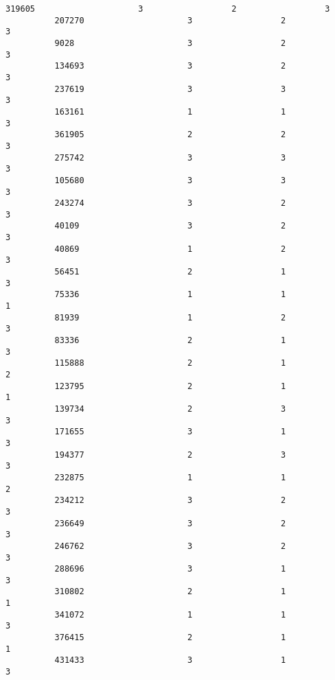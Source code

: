 \documentclass[11pt]{article}
\begin{document}
\begin{Verbatim}[commandchars=\\\{\}]
          319605                     3                  2                  3   
          207270                     3                  2                  3   
          9028                       3                  2                  3   
          134693                     3                  2                  3   
          237619                     3                  3                  3   
          163161                     1                  1                  3   
          361905                     2                  2                  3   
          275742                     3                  3                  3   
          105680                     3                  3                  3   
          243274                     3                  2                  3   
          40109                      3                  2                  3   
          40869                      1                  2                  3   
          56451                      2                  1                  3   
          75336                      1                  1                  1   
          81939                      1                  2                  3   
          83336                      2                  1                  3   
          115888                     2                  1                  2   
          123795                     2                  1                  1   
          139734                     2                  3                  3   
          171655                     3                  1                  3   
          194377                     2                  3                  3   
          232875                     1                  1                  2   
          234212                     3                  2                  3   
          236649                     3                  2                  3   
          246762                     3                  2                  3   
          288696                     3                  1                  3   
          310802                     2                  1                  1   
          341072                     1                  1                  3   
          376415                     2                  1                  1   
          431433                     3                  1                  3   
          

\end{Verbatim}
\end{document}
